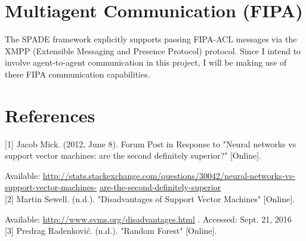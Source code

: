 \documentclass{article}
\begin{document}
\section{Multiagent Communication (FIPA)}
The SPADE framework explicitly supports passing FIPA-ACL messages via the XMPP (Extensible Messaging and Presence Protocol) protocol. Since I intend to involve agent-to-agent communication in this project, I will be making use of these FIPA communication capabilities.
\section{References}
{[}1{]} Jacob Mick. (2012, June 8). Forum Post in Response to "Neural networks vs support vector machines: are the second definitely superior?" {[}Online{]}. 

Available: 
\textcolor{blue}{\underline{\href{http://stats.stackexchange.com/questions/30042/neural-networks-vs-support-vector-machines-are-the-second-definitely-superior}{http://stats.stackexchange.com/questions/30042/neural-networks-vs-support-vector-machines-}}}
\textcolor{blue}{\underline{\href{http://stats.stackexchange.com/questions/30042/neural-networks-vs-support-vector-machines-are-the-second-definitely-superior}{are-the-second-definitely-superior}}}
\\
{[}2{]} Martin Sewell. (n.d.). "Disadvantages of Support Vector Machines" {[}Online{]}. 

Available:
\textcolor{blue}{\underline{\href{http://www.svms.org/disadvantages.html}{http://www.svms.org/disadvantages.html}}}
. Accessed: Sept. 21, 2016
\\
{[}3{]} Predrag Radenkovi\'{c}. (n.d.). "Random Forest" {[}Online{]}. 
\end{document}
